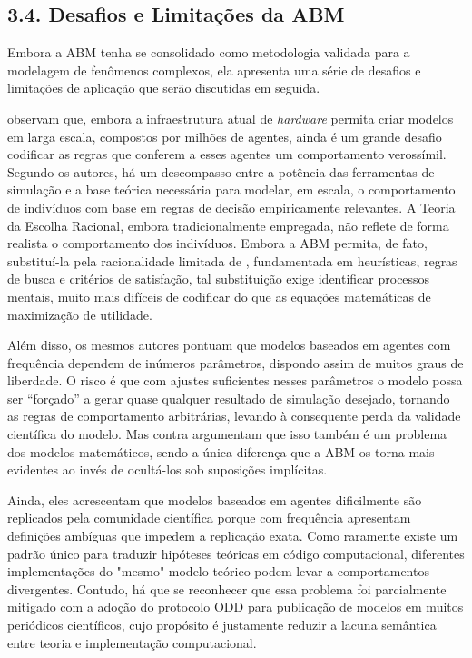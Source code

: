 \documentclass[12pt,oneside,a4paper,brazil,sumario=tradicional]{abntex2}
\begin{document}
\subsection*{3.4. Desafios e Limitações da ABM}
Embora a ABM tenha se consolidado como metodologia validada para a modelagem de fenômenos complexos, ela apresenta uma série de desafios e limitações de aplicação que serão discutidas em seguida.

\textcite{namatame2016} observam que, embora a infraestrutura atual de \textit{hardware} permita criar modelos em larga escala, compostos por milhões de agentes, ainda é um grande desafio codificar as regras que conferem a esses agentes um comportamento verossímil. Segundo os autores, há um descompasso entre a potência das ferramentas de simulação e a base teórica necessária para modelar, em escala, o comportamento de indivíduos com base em regras de decisão empiricamente relevantes. A Teoria da Escolha Racional, embora tradicionalmente empregada, não reflete de forma realista o comportamento dos indivíduos. Embora a ABM permita, de fato, substituí-la pela racionalidade limitada de \textcite{simon1957}, fundamentada em heurísticas, regras de busca e critérios de satisfação, tal substituição exige identificar processos mentais, muito mais difíceis de codificar do que as equações matemáticas de maximização de utilidade.

Além disso, os mesmos autores pontuam que modelos baseados em agentes com frequência dependem de inúmeros parâmetros, dispondo assim de muitos graus de liberdade. O risco é que com ajustes suficientes nesses parâmetros o modelo possa ser “forçado” a gerar quase qualquer resultado de simulação desejado, tornando as regras de comportamento arbitrárias, levando à consequente perda da validade científica do modelo. Mas \textcite{wilensky2015} contra argumentam que isso também é um problema dos modelos matemáticos, sendo a única diferença que a ABM os torna mais evidentes ao invés de ocultá-los sob suposições implícitas.

Ainda, eles acrescentam que modelos baseados em agentes dificilmente são replicados pela comunidade científica porque com frequência apresentam definições ambíguas que impedem a replicação exata. Como raramente existe um padrão único para traduzir hipóteses teóricas em código computacional, diferentes implementações do "mesmo" modelo teórico podem levar a comportamentos divergentes. Contudo, há que se reconhecer que essa problema foi parcialmente mitigado com a adoção do protocolo ODD \parencite{grimm2006} para publicação de modelos em muitos periódicos científicos, cujo propósito é justamente reduzir a lacuna semântica entre teoria e implementação computacional.
\end{document}
